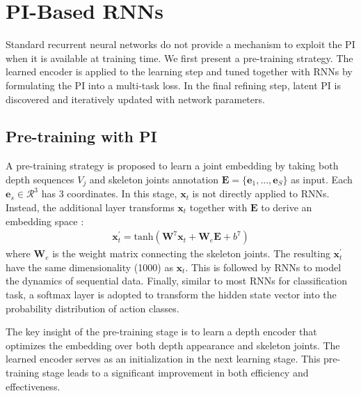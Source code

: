 \documentclass[10pt,twocolumn,letterpaper]{article}
\begin{document}
\section{PI-Based RNNs}

Standard recurrent neural networks do not provide a mechanism to exploit the PI when it is available at training time. We first present a pre-training strategy. The learned encoder is applied to the learning step and  tuned together with RNNs by formulating the PI into a multi-task loss. In the final refining step, latent PI is discovered and iteratively updated with network parameters.


\subsection{Pre-training with PI}
\label{sec:pretrain}

A pre-training strategy is proposed to learn a joint embedding by taking both depth sequences $V_j$ and skeleton joints annotation $\bm{E}=\{ \bm{e}_1,...,\bm{e}_S \}$ as input. Each $\bm{e}_s \in \mathcal{R}^3$ has 3 coordinates. In this stage, $\bm{x}_t$ is not directly applied to RNNs. Instead, the additional layer transforms $\bm{x}_t$ together with $\bm{E}$ to derive an embedding space : 
\begin{align}
\bm{x}^{\prime}_t=\mathrm{tanh}(\bm{W}^7\bm{x}_t+\bm{W}_{e}\bm{E}+b^7)
\label{eq:pretrain}
\end{align}
where $\bm{W}_{e}$ is the weight matrix connecting the skeleton joints. The resulting $\bm{x}^{\prime}_t$ have the same dimensionality (1000) as $\bm{x}_t$. This is followed by RNNs to model the dynamics of sequential data. Finally, similar to most RNNs for classification task, a softmax layer is adopted to transform the hidden state vector into the probability distribution of action classes.

The key insight of the pre-training stage is to learn a depth encoder that optimizes the embedding over both depth appearance and skeleton joints. The learned encoder serves as an initialization in the next learning stage. This pre-training stage leads to a significant improvement in both efficiency and effectiveness. 
\end{document}
